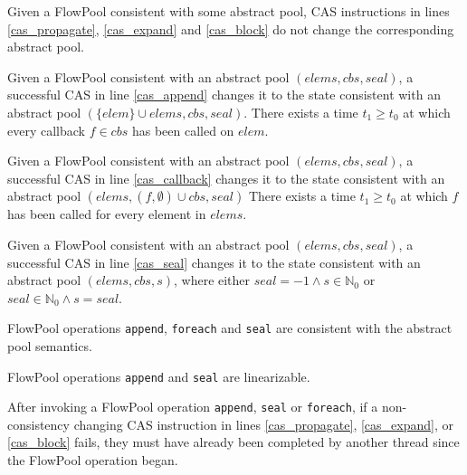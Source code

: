 \begin{lemmatwo}
Given a FlowPool consistent with some abstract
pool, CAS instructions in lines \ref{cas_propagate}, \ref{cas_expand} and
\ref{cas_block} do not change the corresponding abstract pool.
\end{lemmatwo}

\begin{lemmatwo}
Given a FlowPool consistent with an abstract pool $(elems, cbs,
seal)$, a successful CAS in line \ref{cas_append}
changes it to the state consistent with an abstract pool
$(\{elem\} \cup elems, cbs, seal)$.
There exists a time $t_1 \geq t_0$ at which every callback $f \in
cbs$ has been called on $elem$.
\end{lemmatwo}

\begin{lemmatwo}
Given a FlowPool consistent with an abstract pool $(elems, cbs, seal)$,
a successful CAS in line \ref{cas_callback} changes it
to the state consistent with an abstract pool $(elems, (f, \emptyset)
\cup cbs, seal)$
There exists a time $t_1 \geq t_0$ at which $f$ has been called for
every element in $elems$.
\end{lemmatwo}

\begin{lemmatwo}
Given a FlowPool consistent with an abstract pool $(elems, cbs, seal)$,
a successful CAS in line \ref{cas_seal} changes it to the state
consistent with an abstract pool $(elems, cbs, s)$, where either $seal
= -1 \wedge s \in \mathbb{N}_0$ or $seal \in \mathbb{N}_0 \wedge s = seal$.
\end{lemmatwo}

\begin{theoremtwo}[Safety]
FlowPool operations \verb=append=, \verb=foreach=
and \verb=seal= are consistent with the abstract pool semantics.
\end{theoremtwo}

\begin{theoremtwo}
FlowPool operations \verb=append= and \verb=seal= are linearizable.
\end{theoremtwo}

\begin{lemmatwo}
After invoking a FlowPool operation \verb=append=, \verb=seal= or
\verb=foreach=, if a non-consistency changing CAS instruction in lines
\ref{cas_propagate}, \ref{cas_expand}, or \ref{cas_block} fails, they must have
already been completed by another thread since the FlowPool operation began.
\end{lemmatwo}

